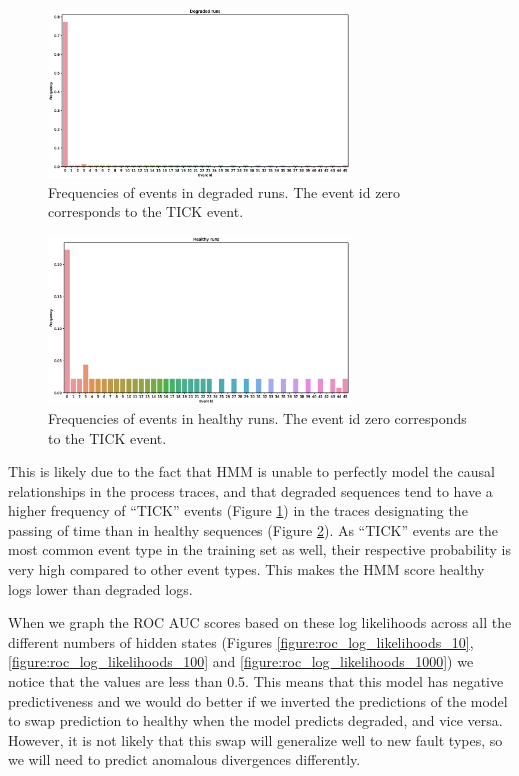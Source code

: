 \documentclass[journal]{IEEEtran}
\begin{document}
\begin{figure}[h]
 \centering
 \includegraphics[width=8cm,keepaspectratio=true]{./degraded_runs_data_histogram.eps}
 \caption{Frequencies of events in degraded runs. The event id zero corresponds to the TICK event.}
 \label{figure:degraded_histogram}
\end{figure}

\begin{figure}[h]
 \centering
 \includegraphics[width=8cm,keepaspectratio=true]{./healthy_runs_data_histogram.eps}
 \caption{Frequencies of events in healthy runs. The event id zero corresponds to the TICK event.}
 \label{figure:healthy_histogram}
\end{figure}

This is likely due to the fact that HMM is unable to perfectly model the causal relationships in the process traces, and that degraded sequences tend to have a higher frequency of ``TICK'' events (Figure \ref{figure:degraded_histogram}) in the traces designating the passing of time than in healthy sequences (Figure \ref{figure:healthy_histogram}). As ``TICK'' events are the most common event type in the training set as well, their respective probability is very high compared to other event types. This makes the HMM score healthy logs  lower than degraded logs.

When we graph the ROC AUC scores based on these log likelihoods across all the different numbers of hidden states (Figures \ref{figure:roc_log_likelihoods_10}, \ref{figure:roc_log_likelihoods_100} and \ref{figure:roc_log_likelihoods_1000}) we notice that the values are less than 0.5. This means that this model has negative predictiveness and we would do better if we inverted the predictions of the model to swap prediction to healthy when the model predicts degraded, and vice versa. However, it is not likely that this swap will generalize well to new fault types, so we will need to predict anomalous divergences differently.
\end{document}
